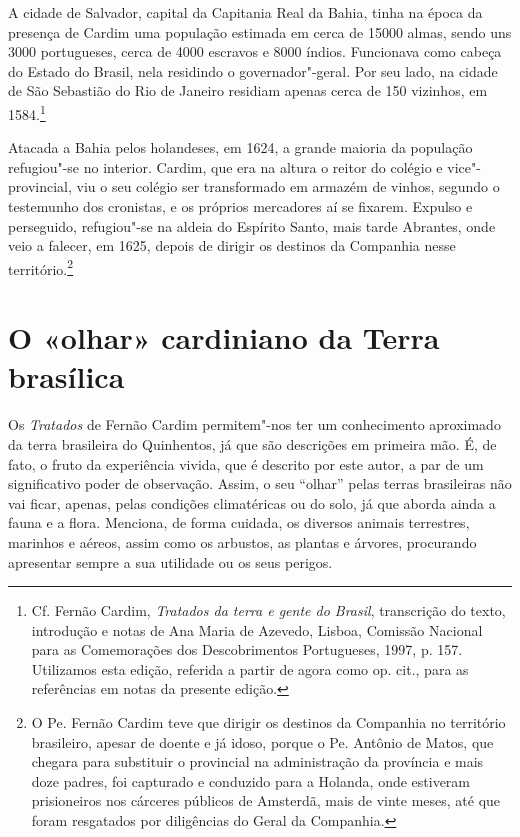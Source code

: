 A cidade de Salvador, capital da Capitania Real da Bahia, tinha na
época da presença de Cardim uma população estimada em cerca de 15000
almas, sendo uns 3000 portugueses, cerca de 4000 escravos e 8000
índios. Funcionava como cabeça do Estado do Brasil, nela residindo o
governador"-geral. Por seu lado, na cidade de São Sebastião do Rio de
Janeiro residiam apenas cerca de 150 vizinhos, em 1584.\footnote{ Cf. Fernão Cardim, 
\textit{Tratados da terra e gente do Brasil}, transcrição do texto, introdução e notas de 
Ana Maria de Azevedo, Lisboa, Comissão Nacional para as Comemorações dos Descobrimentos Portugueses, 
1997, p. 157. Utilizamos esta edição, referida a partir de agora como op. cit., 
para as referências em notas da presente edição.}

Atacada a Bahia pelos holandeses, em 1624, a grande maioria da
população refugiou"-se no interior. Cardim, que era na altura o reitor
do colégio e vice"-provincial, viu o seu colégio ser transformado em
armazém de vinhos, segundo o testemunho dos cronistas, e os próprios
mercadores aí se fixarem. Expulso e perseguido, refugiou"-se na aldeia
do Espírito Santo, mais tarde Abrantes, onde veio a falecer, em 1625,
depois de dirigir os destinos da Companhia nesse território.\footnote{ O Pe. 
Fernão Cardim teve que dirigir os destinos da Companhia no
território brasileiro, apesar de doente e já idoso, porque o Pe. Antônio 
de Matos, que chegara para substituir o provincial na
administração da província e mais doze padres, foi capturado e
conduzido para a Holanda, onde estiveram prisioneiros nos cárceres
públicos de Amsterdã, mais de vinte meses, até que foram resgatados
por diligências do Geral da Companhia.} 



\section{O «olhar» cardiniano da Terra brasílica}

 Os \textit{Tratados} de Fernão Cardim permitem"-nos ter um
conhecimento aproximado da terra brasileira do Quinhentos, já que são
descrições em primeira mão. É, de fato, o fruto da experiência vivida,
que é descrito por este autor, a par de um significativo poder de
observação. Assim, o seu ``olhar'' pelas terras brasileiras não vai
ficar, apenas, pelas condições climatéricas ou do solo, já que aborda
ainda a fauna e a flora. Menciona, de forma cuidada, os diversos
animais terrestres, marinhos e aéreos, assim como os arbustos, as
plantas e árvores, procurando apresentar sempre a sua utilidade ou os seus perigos.

